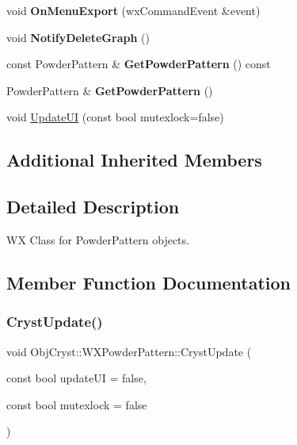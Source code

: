 \begin{DoxyCompactItemize}
\mbox{\label{class_obj_cryst_1_1_w_x_powder_pattern_a521d4953382adcc4909399d6485c004b}} 
void {\bfseries On\+Menu\+Export} (wx\+Command\+Event \&event)
\item 
\mbox{\label{class_obj_cryst_1_1_w_x_powder_pattern_a5ff2abf78afc1cf9b9b44f056e9b1a1c}} 
void {\bfseries Notify\+Delete\+Graph} ()
\item 
\mbox{\label{class_obj_cryst_1_1_w_x_powder_pattern_a66bb4fb2fc5bca8e493a6998deddea76}} 
const Powder\+Pattern \& {\bfseries Get\+Powder\+Pattern} () const
\item 
\mbox{\label{class_obj_cryst_1_1_w_x_powder_pattern_af8e7b230e788fc5e44bff834adf8469b}} 
Powder\+Pattern \& {\bfseries Get\+Powder\+Pattern} ()
\item 
void \mbox{\hyperlink{class_obj_cryst_1_1_w_x_powder_pattern_aaeace05033eaea9499398825fc8244da}{Update\+UI}} (const bool mutexlock=false)
\end{DoxyCompactItemize}
\subsection*{Additional Inherited Members}


\subsection{Detailed Description}
WX Class for Powder\+Pattern objects. 

\subsection{Member Function Documentation}
\mbox{\label{class_obj_cryst_1_1_w_x_powder_pattern_a8bdd59548c11c11a53197c0679c258a8}} 
\subsubsection{\texorpdfstring{CrystUpdate()}{CrystUpdate()}}
{\footnotesize\ttfamily void Obj\+Cryst\+::\+W\+X\+Powder\+Pattern\+::\+Cryst\+Update (\begin{DoxyParamCaption}\item[{const bool}]{update\+UI = {\ttfamily false},  }\item[{const bool}]{mutexlock = {\ttfamily false} }\end{DoxyParamCaption})\hspace{0.3cm}{\ttfamily [virtual]}}

